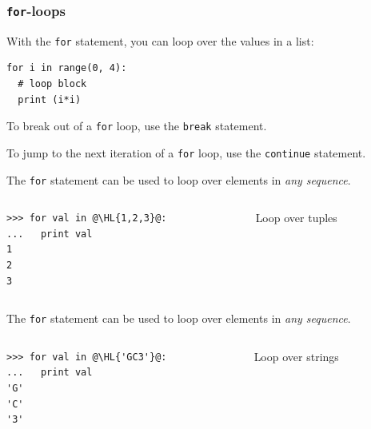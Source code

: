\documentclass[english,serif,mathserif,xcolor=pdftex,dvipsnames,table]{beamer}
\begin{document}


\begin{frame}[fragile]
  \frametitle{\texttt{for}-loops}
    With the  \texttt{for} statement, you can loop over the values in
    a list:
\begin{lstlisting}
for i in range(0, 4):
  # loop block
  print (i*i)
\end{lstlisting}

  \+
  To break out of a \texttt{for} loop, use the \texttt{break}
  statement.

  \+
  To jump to the next iteration of a \texttt{for} loop, use the
  \texttt{continue} statement.
\end{frame}


\begin{frame}[fragile]
  The \texttt{for} statement can be used to loop over elements in \emph{any sequence}.

  \+
  \begin{columns}[c]
    \begin{column}{0.5\textwidth}
\begin{lstlisting}
>>> for val in @\HL{1,2,3}@:
...   print val
1
2
3
\end{lstlisting}
    \end{column}
    \begin{column}{0.4\textwidth}
      \raggedleft
      Loop over tuples
    \end{column}
  \end{columns}
\end{frame}

\begin{frame}[fragile]
  The \texttt{for} statement can be used to loop over elements in \emph{any sequence}.

  \+
  \begin{columns}[c]
    \begin{column}{0.5\textwidth}
\begin{lstlisting}
>>> for val in @\HL{'GC3'}@:
...   print val
'G'
'C'
'3'
\end{lstlisting}
    \end{column}
    \begin{column}{0.4\textwidth}
      \raggedleft
      Loop over strings
    \end{column}
  \end{columns}
\end{frame}
\end{document}
